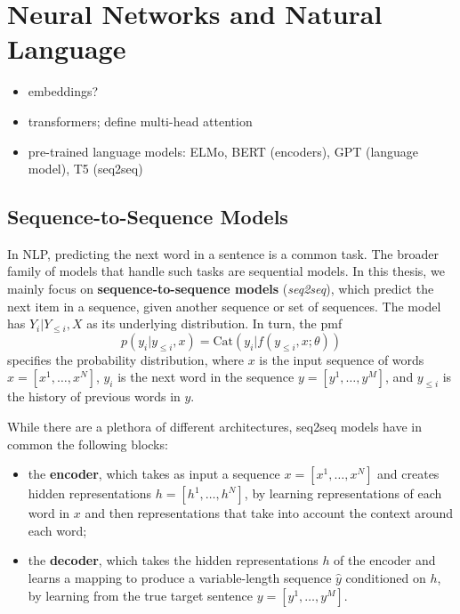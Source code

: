 \section{Neural Networks and Natural Language}

\begin{itemize}
    \item embeddings?
    \item transformers; define multi-head attention
    \item pre-trained language models: ELMo, BERT (encoders), GPT (language model), T5 (seq2seq)
\end{itemize}

\subsection{Sequence-to-Sequence Models}
\label{sec:transformer_bg}

\noindent In NLP, predicting the next word in a sentence is a common task. The
broader family of models that handle such tasks are sequential
models. In this thesis, we mainly focus on
\textbf{sequence-to-sequence models} (\textit{seq2seq}), which
predict the next item in a sequence, given another sequence or set of
sequences. The model has $Y_i | Y_{\leq i}, X$ as its underlying
distribution. In turn, the pmf
%
\begin{equation}
    p(y_i|y_{\leq i}, x) = \text{Cat}(y_i|f(y_{\leq i}, x; \theta))
\end{equation}
%
specifies the probability distribution, where $x$ is the input
sequence of words $x=[x^1, \dots, x^N]$, $y_i$ is the next word in
the sequence $y=[y^1, \dots, y^M]$, and $y_{\leq i}$ is the history
of previous words in $y$.

While there are a plethora of different architectures,
seq2seq models have in common the following blocks:

\begin{itemize}
    \item the {\bf encoder}, which takes as input a sequence $x=[x^1,
              \dots, x^N]$ and creates hidden representations $h=[h^1, \dots,
              h^N]$, by learning representations of each word in $x$ and then
          representations that take into account the context around each word;
    \item the {\bf decoder}, which takes the hidden representations
          $h$ of the encoder and learns a mapping to produce a
          variable-length sequence $\hat{y}$ conditioned on $h$, by
          learning from the true target sentence $y=[y^1, \dots, y^M]$.
\end{itemize}

